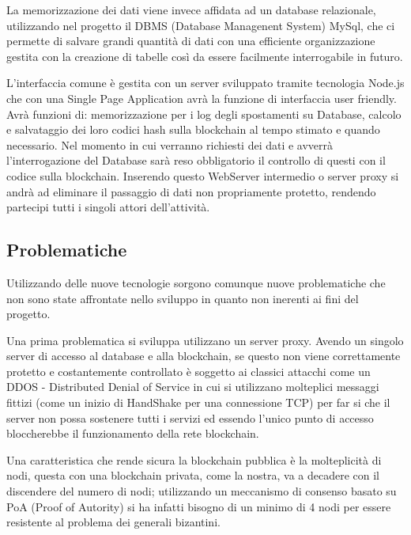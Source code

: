 \documentclass[11pt,a4paper,titlepage]{report}
\begin{document}
La memorizzazione dei dati viene invece affidata ad un database relazionale, utilizzando nel progetto il DBMS (Database Managenent System) MySql, che ci permette di salvare grandi quantità di dati con una efficiente organizzazione gestita con la creazione di tabelle così da essere facilmente interrogabile in futuro.
 
L'interfaccia comune è gestita con un server sviluppato tramite tecnologia Node.js che con una Single Page Application avrà la funzione di interfaccia user friendly. Avrà funzioni di: memorizzazione per i log degli spostamenti su Database, calcolo e salvataggio dei loro codici hash sulla blockchain al tempo stimato e quando necessario. Nel momento in cui verranno richiesti dei dati e avverrà l'interrogazione del Database sarà reso obbligatorio il controllo di questi con il codice sulla blockchain. Inserendo questo WebServer intermedio o server proxy si andrà ad eliminare il passaggio di dati non propriamente protetto, rendendo partecipi tutti i singoli attori dell'attività.

\subsection{Problematiche}
Utilizzando delle nuove tecnologie sorgono comunque nuove problematiche che non sono state affrontate nello sviluppo in quanto non inerenti ai fini del progetto.

Una prima problematica si sviluppa utilizzano un server proxy. Avendo un singolo server di accesso al database e alla blockchain, se questo non viene correttamente protetto e costantemente controllato è soggetto ai classici attacchi come un DDOS - Distributed Denial of Service in cui si utilizzano molteplici messaggi fittizi (come un inizio di HandShake per una connessione TCP) per far si che il server non possa sostenere tutti i servizi ed essendo l'unico punto di accesso bloccherebbe il funzionamento della rete blockchain.

Una caratteristica che rende sicura la blockchain pubblica è la molteplicità di nodi, questa con una blockchain privata, come la nostra, va a decadere con il discendere  del numero di nodi; utilizzando un meccanismo di consenso basato su PoA (Proof of Autority) si ha infatti bisogno di un minimo di 4 nodi per essere resistente al problema dei generali bizantini.
\end{document}
